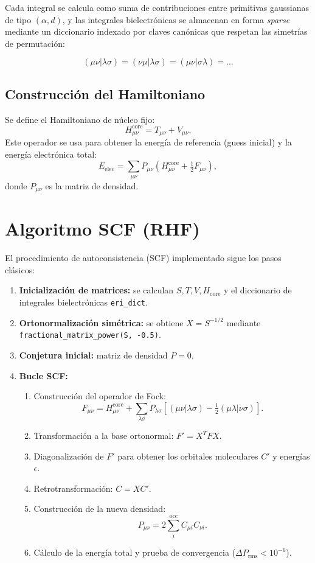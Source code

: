 \documentclass[11pt]{article}
\begin{document}
Cada integral se calcula como suma de contribuciones entre primitivas gaussianas de tipo \((\alpha, d)\),
y las integrales bielectrónicas se almacenan en forma \emph{sparse} mediante un diccionario indexado
por claves canónicas que respetan las simetrías de permutación:

\[
(\mu\nu|\lambda\sigma) = (\nu\mu|\lambda\sigma) = (\mu\nu|\sigma\lambda) = \ldots
\]

\subsection{Construcción del Hamiltoniano}
Se define el Hamiltoniano de núcleo fijo:
\[
H_{\mu\nu}^{\text{core}} = T_{\mu\nu} + V_{\mu\nu}.
\]
Este operador se usa para obtener la energía de referencia (guess inicial)
y la energía electrónica total:
\[
E_{\text{elec}} = \sum_{\mu\nu} P_{\mu\nu}(H_{\mu\nu}^{\text{core}} + \tfrac{1}{2}F_{\mu\nu}),
\]
donde \(P_{\mu\nu}\) es la matriz de densidad.

\section{Algoritmo SCF (RHF)}
El procedimiento de autoconsistencia (SCF) implementado sigue los pasos clásicos:

\begin{enumerate}
\item \textbf{Inicialización de matrices:} se calculan \(S, T, V, H_{\text{core}}\)
y el diccionario de integrales bielectrónicas \texttt{eri\_dict}.
\item \textbf{Ortonormalización simétrica:} se obtiene \(X = S^{-1/2}\) mediante
\texttt{fractional\_matrix\_power(S, -0.5)}.
\item \textbf{Conjetura inicial:} matriz de densidad \(P=0\).
\item \textbf{Bucle SCF:}
  \begin{enumerate}
  \item Construcción del operador de Fock:
  \[
  F_{\mu\nu} = H_{\mu\nu}^{\text{core}} + \sum_{\lambda\sigma} P_{\lambda\sigma}
  \left[ (\mu\nu|\lambda\sigma) - \tfrac{1}{2}(\mu\lambda|\nu\sigma) \right].
  \]
  \item Transformación a la base ortonormal: \( F' = X^T F X \).
  \item Diagonalización de \(F'\) para obtener los orbitales moleculares \(C'\) y energías \(\epsilon\).
  \item Retrotransformación: \(C = X C'\).
  \item Construcción de la nueva densidad:
  \[
  P_{\mu\nu} = 2 \sum_{i}^{\text{occ}} C_{\mu i} C_{\nu i}.
  \]
  \item Cálculo de la energía total y prueba de convergencia (\(\Delta P_{\text{rms}} < 10^{-6}\)).
  \end{enumerate}
\end{enumerate}
\end{document}
